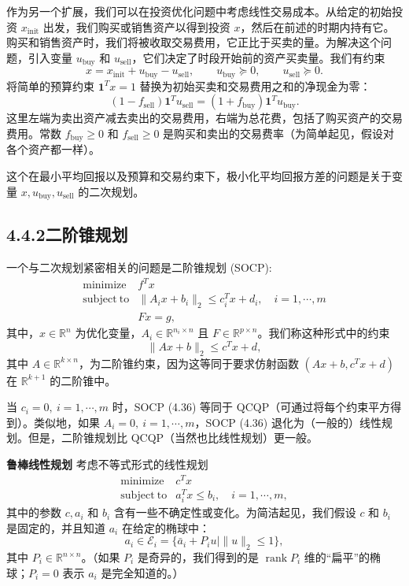 \documentclass[UTF8,12pt,a4paper,fontset=fandol]{ctexart}
\begin{document}
作为另一个扩展，我们可以在投资优化问题中考虑线性交易成本。从给定的初始投资 $x_{\mathrm{init}}$ 出发，我们购买或销售资产以得到投资 $x$，然后在前述的时期内持有它。购买和销售资产时，我们将被收取交易费用，它正比于买卖的量。为解决这个问题，引入变量 $u_{\mathrm{buy}}$ 和 $u_{\mathrm{sell}}$，它们决定了时段开始前的资产买卖量。我们有约束
\[
x=x_{\mathrm{init}}+u_{\mathrm{buy}}-u_{\mathrm{sell}},\qquad
u_{\mathrm{buy}}\succeq 0,\qquad
u_{\mathrm{sell}}\succeq 0.
\]
将简单的预算约束 $\mathbf{1}^Tx=1$ 替换为初始买卖和交易费用之和的净现金为零：
\[
(1-f_{\mathrm{sell}})\mathbf{1}^Tu_{\mathrm{sell}}=(1+f_{\mathrm{buy}})\mathbf{1}^Tu_{\mathrm{buy}}.
\]
这里左端为卖出资产减去卖出的交易费用，右端为总花费，包括了购买资产的交易费用。常数 $f_{\mathrm{buy}}\geq 0$ 和 $f_{\mathrm{sell}}\geq 0$ 是购买和卖出的交易费率（为简单起见，假设对各个资产都一样）。

这个在最小平均回报以及预算和交易约束下，极小化平均回报方差的问题是关于变量 $x,u_{\mathrm{buy}},u_{\mathrm{sell}}$ 的二次规划。

\subsection*{4.4.2\quad 二阶锥规划}

一个与二次规划紧密相关的问题是二阶锥规划 (SOCP):
\begin{equation}
\begin{array}{ll}
\mathop{\mathrm{minimize}} & f^Tx\\
\mathrm{subject\ to} & \|A_ix+b_i\|_2\leq c_i^Tx+d_i,\quad i=1,\cdots,m\\
& Fx=g,
\end{array}
\tag{4.36}
\end{equation}
其中，$x\in\mathbb{R}^n$ 为优化变量，$A_i\in\mathbb{R}^{n_i\times n}$ 且 $F\in\mathbb{R}^{p\times n}$。我们称这种形式中的约束
\[
\|Ax+b\|_2\leq c^Tx+d,
\]
其中 $A\in\mathbb{R}^{k\times n}$，为二阶锥约束，因为这等同于要求仿射函数 $(Ax+b,c^Tx+d)$ 在 $\mathbb{R}^{k+1}$ 的二阶锥中。

当 $c_i=0,\ i=1,\cdots,m$ 时，SOCP (4.36) 等同于 QCQP（可通过将每个约束平方得到）。类似地，如果 $A_i=0,\ i=1,\cdots,m$，SOCP (4.36) 退化为（一般的）线性规划。但是，二阶锥规划比 QCQP（当然也比线性规划）更一般。

\noindent\textbf{鲁棒线性规划}\quad
考虑不等式形式的线性规划
\[
\begin{array}{ll}
\mathop{\mathrm{minimize}} & c^Tx\\
\mathrm{subject\ to} & a_i^Tx\leq b_i,\quad i=1,\cdots,m,
\end{array}
\]
其中的参数 $c,a_i$ 和 $b_i$ 含有一些不确定性或变化。为简洁起见，我们假设 $c$ 和 $b_i$ 是固定的，并且知道 $a_i$ 在给定的椭球中：
\[
a_i\in\mathcal{E}_i=\{\bar a_i+P_iu\mid \|u\|_2\leq 1\},
\]
其中 $P_i\in\mathbb{R}^{n\times n}$。（如果 $P_i$ 是奇异的，我们得到的是 $\operatorname{rank}P_i$ 维的“扁平”的椭球；$P_i=0$ 表示 $a_i$ 是完全知道的。）
\end{document}
